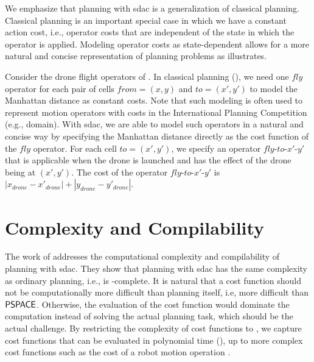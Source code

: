 We emphasize that planning with sdac is a generalization of classical planning. Classical planning is an important special case in which we have a constant action cost, i.e., operator costs that are independent of the state in which the operator is applied.
Modeling operator costs as state-dependent allows for a more natural and concise representation of planning problems as  illustrates.

\begin{example}\label{ex:sdac}
    Consider the drone flight operators of .
    In classical planning (), we need one $\textit{fly}$ operator for each pair of cells $\textit{from}=(x,y)$ and $\textit{to}=(x',y')$ to model the Manhattan distance as constant costs.
    Note that such modeling is often used to represent motion operators with costs in the International Planning Competition (e.g.,  domain).
    With sdac, we are able to model such operators in a natural and concise way by specifying the Manhattan distance directly as the cost function of the $\textit{fly}$ operator.
    For each cell $\textit{to}=(x',y')$, we specify an operator $\textit{fly-to-}x'\textit{-}y'$ that is applicable when the drone is launched and has the effect of the drone being at $(x',y')$.
    The cost of the operator $\textit{fly-to-}x'\textit{-}y'$ is $|x_{\textit{drone}} - x'_{\textit{drone}}| + |y_{\textit{drone}} - y'_{\textit{drone}}|$.
\end{example}

\section{Complexity and Compilability}
The work of \textcite{speck-et-al-icaps2021} addresses the computational complexity and compilability of planning with sdac. They show that planning with sdac has the same complexity as ordinary planning, i.e., is \PSPACE-complete.
It is natural that a cost function should not be computationally more difficult than planning itself, i.e, more difficult than $\mathsf{PSPACE}$. Otherwise, the evaluation of the cost function would dominate the computation instead of solving the actual planning task, which should be the actual challenge.
By restricting the complexity of cost functions to \FPSPACE{}, we capture cost functions that can be evaluated in polynomial time (), up to more complex cost functions such as the cost of a robot motion operation \autocite{reif-focs1979,lavalle-2006}.

